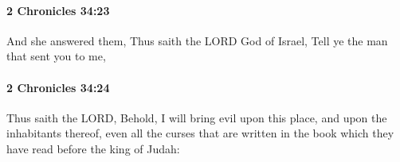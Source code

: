 		\paragraph{2 Chronicles 34:23} %
			\label{2CHRONICLES-34-23}

			And she answered them, Thus saith the LORD God of Israel, Tell ye the man that sent you to me,


		\paragraph{2 Chronicles 34:24} %
			\label{2CHRONICLES-34-24}

			Thus saith the LORD, Behold, I will bring evil upon this place, and upon the inhabitants thereof, even all the curses that are written in the book which they have read before the king of Judah:


